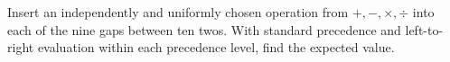 Insert an independently and uniformly chosen operation from $+,-,\times,\div$ into each of the nine gaps between ten twos. With standard precedence and left-to-right evaluation within each precedence level, find the expected value.

